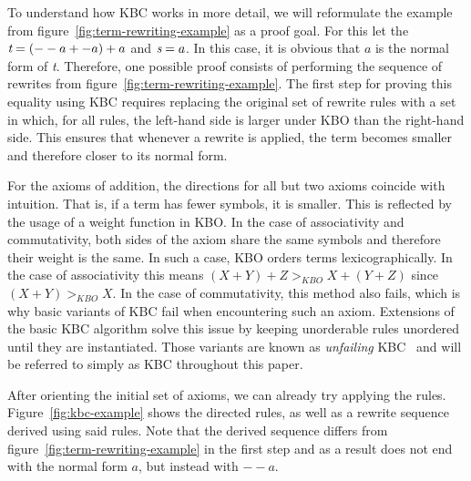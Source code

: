 To understand how KBC works in more detail, we will reformulate the example from figure~\ref{fig:term-rewriting-example} as a proof goal. For this let the $\emph{t} = (--a + -a) + a$ and $\emph{s} = a$. In this case, it is obvious that $a$ is the normal form of \emph{t}. Therefore, one possible proof consists of performing the sequence of rewrites from figure~\ref{fig:term-rewriting-example}. The first step for proving this equality using KBC requires replacing the original set of rewrite rules with a set in which, for all rules, the left-hand side is larger under KBO than the right-hand side. This ensures that whenever a rewrite is applied, the term becomes smaller and therefore closer to its normal form.

For the axioms of addition, the directions for all but two axioms coincide with intuition. That is, if a term has fewer symbols, it is smaller. This is reflected by the usage of a weight function in KBO. In the case of associativity and commutativity, both sides of the axiom share the same symbols and therefore their weight is the same. In such a case, KBO orders terms lexicographically. In the case of associativity this means $(X + Y) + Z >_{KBO} X + (Y + Z)$ since $(X + Y) >_{KBO} X$. In the case of commutativity, this method also fails, which is why basic variants of KBC fail when encountering such an axiom. Extensions of the basic KBC algorithm solve this issue by keeping unorderable rules unordered until they are instantiated. Those variants are known as \emph{unfailing} KBC~\citep{10.1093/comjnl/34.1.2} and will be referred to simply as KBC throughout this paper.

After orienting the initial set of axioms, we can already try applying the rules. Figure~\ref{fig:kbc-example} shows the directed rules, as well as a rewrite sequence derived using said rules. Note that the derived sequence differs from figure~\ref{fig:term-rewriting-example} in the first step and as a result does not end with the normal form $a$, but instead with $--a$. 

